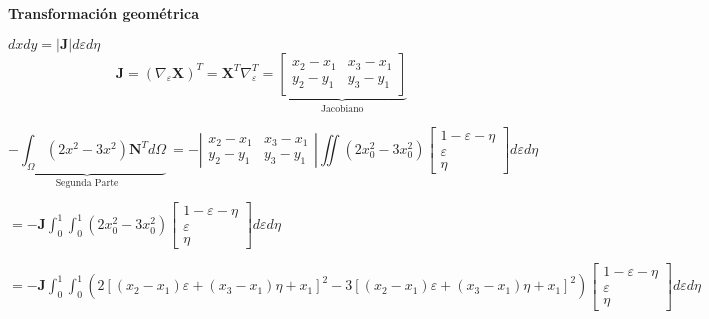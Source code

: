 \documentclass[12pt]{report}
\begin{document}
    \textbf{Transformación geométrica}
    \begin{center}
        $\displaystyle dxdy = |\bm J| d\varepsilon d\eta$
        \[
        \displaystyle
        \ \bm J = \left( \nabla_\varepsilon \bm X \right)^T = \bm X^T \nabla_\varepsilon^T =
        \underbrace{ \left[ \begin{array}{cc} x_2 - x_1 & x_3 - x_1 \\ y_2 - y_1 & y_3 - y_1 \end{array} \right]}_{\text{Jacobiano}} 
        \]

        \[
        \displaystyle 
        \underbrace{-\int_\Omega \left( 2x^2 -3x^2 \right) \bm N^T d\Omega}_{\text{Segunda Parte}} 
        \ = - \left| \begin{array}{cc} x_2 - x_1 & x_3 - x_1 \\ y_2 - y_1 & y_3 - y_1 \end{array} \right| \iint \left( 2x_0^2 -3x_0^2 \right) \left[ \begin{array}{c} 1-\varepsilon - \eta \\ \varepsilon \\ \eta \end{array} \right] d\varepsilon d\eta
        \]

        $\displaystyle = - \bm J \int_0^1 \int_0^1 \left( 2x_0^2 -3x_0^2 \right) \left[ \begin{array}{c} 1-\varepsilon - \eta \\ \varepsilon \\ \eta \end{array} \right] d\varepsilon d\eta$

        $\displaystyle = - \bm J \int_0^1 \int_0^1 \left( 2\left[ (x_2-x_1)\varepsilon + (x_3-x_1)\eta + x_1 \right]^2 -3\left[ (x_2-x_1)\varepsilon + (x_3-x_1)\eta + x_1 \right]^2 \right) \left[ \begin{array}{c} 1-\varepsilon - \eta \\ \varepsilon \\ \eta \end{array} \right] d\varepsilon d\eta$

    \end{center}
\end{document}
